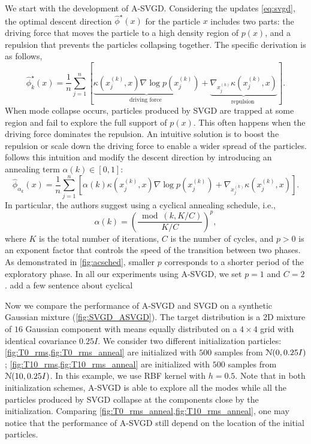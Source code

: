 We start with the development of A-SVGD. Considering the updates
\cref{eq:svgd}, the optimal descent direction $ \hat{\phi}^{\star}(x)$ for
the particle $x$ includes two parts: the driving force that moves the
particle to a high density region of $p(x)$, and a repulsion that prevents
the particles collapsing together. The specific derivation is as follows,
\[
    \hat{\phi}_k^{\star}(x)=\frac{1}{n} \sum_{j=1}^{n}\left[\underbrace{\kappa\left(x_{j}^{(k)}, x\right) \nabla \log p\left(x_{j}^{(k)}\right)}_{\text {driving force }}+\underbrace{\nabla_{x_{j}^{(k)}} \kappa\left(x_{j}^{(k)}, x\right)}_{\text {repulsion }}\right].
\]
When mode collapse occurs, particles produced by SVGD are trapped at some
region and fail to explore the full support of $p(x)$. This often happens
when the driving force dominates the repulsion. An intuitive solution is to
boost the repulsion or scale down the driving force to enable a wider spread
of the particles.
\citet{d2021annealed} follows this intuition and modify the descent direction
by introducing an annealing term $\alpha(k) \in [0, 1]$:
\[\label{eq:asvgd}
    \hat{\phi}_{\alpha_k}\left(x\right) = \frac{1}{n} \sum_{j=1}^{n}\left[ \alpha(k)\kappa\left(x_{j}^{(k)}, x\right) \nabla \log p\left(x_{j}^{(k)}\right)+ \nabla_{x_{j}^{(k)}} \kappa\left(x_{j}^{(k)}, x\right)\right].
\]
In particular, the authors suggest using a cyclical annealing schedule, i.e., 
\[
    \alpha(k)=\left(\frac{\bmod (k, K / C)}{K / C}\right)^{p},
\]
where $K$ is the total number of iterations, $C$ is the number of cycles, and
$p > 0$ is an exponent factor that controls the speed of the transition
between two phases. As demonstrated in \cref{fig:acsched}, smaller $p$
corresponds to a shorter period of the exploratory phase. In all our
experiments using A-SVGD, we set $ p = 1$ and $C = 2$. {\color{red} add a few
sentence about cyclical }

Now we compare the performance of A-SVGD and SVGD on a synthetic Gaussian
mixture (\cref{fig:SVGD_ASVGD}). The target distribution is a 2D mixture of
$16$ Gaussian component with means equally distributed on a $4 \times 4$ grid
with identical covariance $0.25I$. We consider two different initialization
particles: \cref{fig:T0_rms,fig:T0_rms_anneal} are initialized with $500$
\iid samples from $\mathcal{N}(0, 0.25I)$;
\cref{fig:T10_rms,fig:T10_rms_anneal} are initialized with $500$ \iid samples
from $\mathcal{N}(10, 0.25I)$. In this example, we use RBF kernel with 
$h =0.5$. Note that in both initialization schemes, A-SVGD is able to explore all
the modes while all the particles produced by SVGD collapse at the components
close by the initialization. Comparing
\cref{fig:T0_rms_anneal,fig:T10_rms_anneal}, one may notice that the
performance of A-SVGD still depend on the location of the initial particles.

